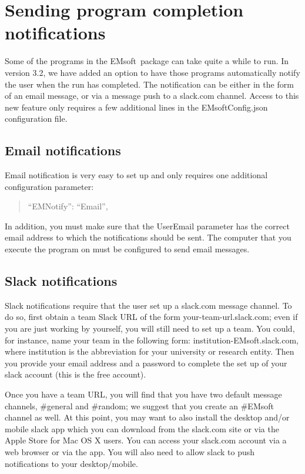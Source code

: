 \documentclass[DIV=calc, paper=letter, fontsize=11pt]{scrartcl}	 %
\newcommand{\ctp}{\textsf{EMsoft}}
\begin{document}
\section{Sending program completion notifications\label{sec:notification}}
Some of the programs in the \ctp\ package can take quite a while to run.  In version 3.2, we have added an option to have those programs automatically notify
the user when the run has completed.  The notification can be either in the form of an email message, or via a message push to a slack.com channel.  Access
to this new feature only requires a few additional lines in the \textsf{EMsoftConfig.json} configuration file.

\subsection{Email notifications}
Email notification is very easy to set up and only requires one additional configuration parameter:
\begin{verse}
	{\color{blue} ``EMNotify'': ``Email''},
\end{verse}
In addition, you must make sure that the \textsf{UserEmail} parameter has the correct email address to which the notifications should be sent.  The computer that you
execute the program on must be configured to send email messages.

\subsection{Slack notifications}
Slack notifications require that the user set up a slack.com message channel.  To do so, first obtain a team Slack URL of the form \textsf{your-team-url.slack.com};
even if you are just working by yourself, you will still need to set up a team.  You could, for instance, name your team in the following form: \textsf{institution-EMsoft.slack.com},
where \textsf{institution} is the abbreviation for your university or research entity.   Then you provide your email address and a password to complete the set up
of your slack account (this is the free account). 

Once you have a team URL, you will find that you have two default message channels, \textsf{\#general} and \textsf{\#random}; we suggest that you create an \textsf{\#EMsoft}
channel as well.  At this point, you may want to also install the desktop and/or mobile slack app which you can download from the slack.com site or via the Apple Store for Mac OS X
users.  You can access your slack.com account via a web browser or via the app.  You will also need to allow slack to push notifications to your desktop/mobile.
\end{document}
